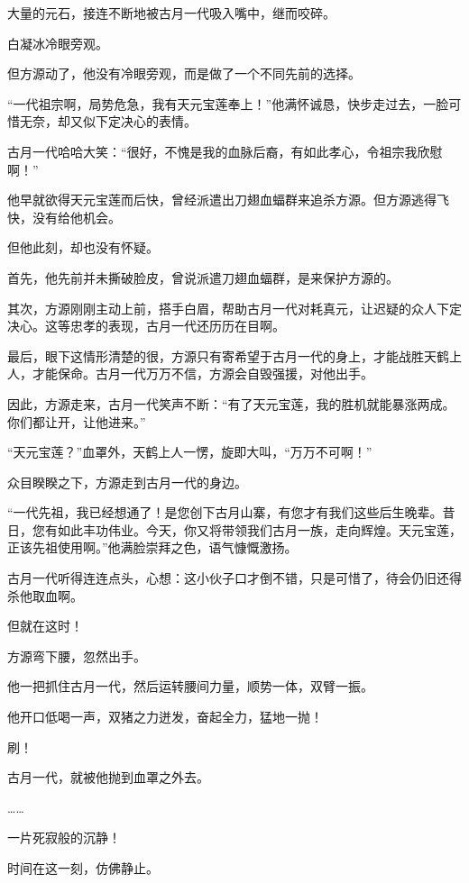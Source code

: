 
\begin{this_body}

大量的元石，接连不断地被古月一代吸入嘴中，继而咬碎。

白凝冰冷眼旁观。

但方源动了，他没有冷眼旁观，而是做了一个不同先前的选择。

“一代祖宗啊，局势危急，我有天元宝莲奉上！”他满怀诚恳，快步走过去，一脸可惜无奈，却又似下定决心的表情。

古月一代哈哈大笑：“很好，不愧是我的血脉后裔，有如此孝心，令祖宗我欣慰啊！”

他早就欲得天元宝莲而后快，曾经派遣出刀翅血蝠群来追杀方源。但方源逃得飞快，没有给他机会。

但他此刻，却也没有怀疑。

首先，他先前并未撕破脸皮，曾说派遣刀翅血蝠群，是来保护方源的。

其次，方源刚刚主动上前，搭手白眉，帮助古月一代对耗真元，让迟疑的众人下定决心。这等忠孝的表现，古月一代还历历在目啊。

最后，眼下这情形清楚的很，方源只有寄希望于古月一代的身上，才能战胜天鹤上人，才能保命。古月一代万万不信，方源会自毁强援，对他出手。

因此，方源走来，古月一代笑声不断：“有了天元宝莲，我的胜机就能暴涨两成。你们都让开，让他进来。”

“天元宝莲？”血罩外，天鹤上人一愣，旋即大叫，“万万不可啊！”

众目睽睽之下，方源走到古月一代的身边。

“一代先祖，我已经想通了！是您创下古月山寨，有您才有我们这些后生晚辈。昔日，您有如此丰功伟业。今天，你又将带领我们古月一族，走向辉煌。天元宝莲，正该先祖使用啊。”他满脸崇拜之色，语气慷慨激扬。

古月一代听得连连点头，心想：这小伙子口才倒不错，只是可惜了，待会仍旧还得杀他取血啊。

但就在这时！

方源弯下腰，忽然出手。

他一把抓住古月一代，然后运转腰间力量，顺势一体，双臂一振。

他开口低喝一声，双猪之力迸发，奋起全力，猛地一抛！

刷！

古月一代，就被他抛到血罩之外去。

……

一片死寂般的沉静！

时间在这一刻，仿佛静止。


\end{this_body}
